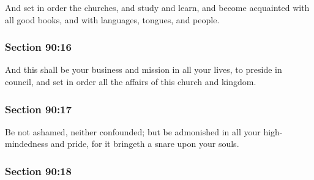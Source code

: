 		And set in order the churches, and study and learn, and become acquainted with all good books, and with languages, tongues, and people.


	\subsubsection{Section 90:16} %
		\label{DC90-16}

		And this shall be your business and mission in all your lives, to preside in council, and set in order all the affairs of this church and kingdom.


	\subsubsection{Section 90:17} %
		\label{DC90-17}

		Be not ashamed, neither confounded; but be admonished in all your high-mindedness and pride, for it bringeth a snare upon your souls.


	\subsubsection{Section 90:18} %
		\label{DC90-18}

